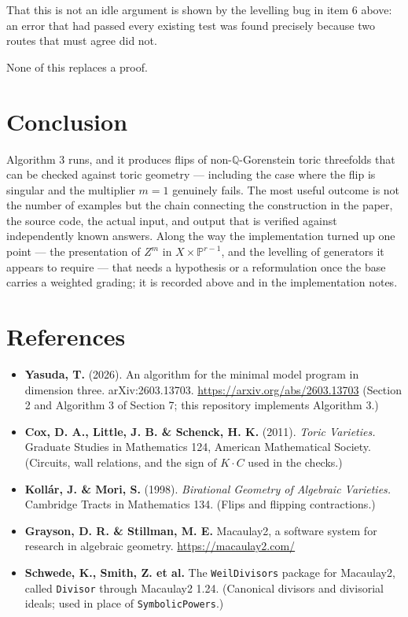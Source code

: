 \documentclass[11pt,reqno]{amsart}
\newcommand{\PP}{\ensuremath{\mathbb{P}}}
\newcommand{\QQ}{\ensuremath{\mathbb{Q}}}
\theoremstyle{plain}
\theoremstyle{definition}
\begin{document}
That this is not an idle argument is shown by the levelling bug in item
6 above: an error that had passed every existing test was found
precisely because two routes that must agree did not.

None of this replaces a proof.

\section{Conclusion}\label{conclusion}

Algorithm 3 runs, and it produces flips of non-\QQ{}-Gorenstein toric
threefolds that can be checked against toric geometry --- including the
case where the flip is singular and the multiplier \(m = 1\) genuinely
fails. The most useful outcome is not the number of examples but the
chain connecting the construction in the paper, the source code, the
actual input, and output that is verified against independently known
answers. Along the way the implementation turned up one point --- the
presentation of \(Z^m\) in \(X \times \PP^{r-1}\), and the levelling of
generators it appears to require --- that needs a hypothesis or a
reformulation once the base carries a weighted grading; it is recorded
above and in the implementation notes.

\section{References}\label{references}

\begin{itemize}
\item
  \textbf{Yasuda, T.} (2026). An algorithm for the minimal model program
  in dimension three. arXiv:2603.13703.
  \url{https://arxiv.org/abs/2603.13703} (Section 2 and Algorithm 3 of
  Section 7; this repository implements Algorithm 3.)
\item
  \textbf{Cox, D. A., Little, J. B. \& Schenck, H. K.} (2011).
  \emph{Toric Varieties.} Graduate Studies in Mathematics 124, American
  Mathematical Society. (Circuits, wall relations, and the sign of
  \(K \cdot C\) used in the checks.)
\item
  \textbf{Kollár, J. \& Mori, S.} (1998). \emph{Birational Geometry of
  Algebraic Varieties.} Cambridge Tracts in Mathematics 134. (Flips and
  flipping contractions.)
\item
  \textbf{Grayson, D. R. \& Stillman, M. E.} Macaulay2, a software
  system for research in algebraic geometry.
  \url{https://macaulay2.com/}
\item
  \textbf{Schwede, K., Smith, Z. et al.} The \texttt{WeilDivisors}
  package for Macaulay2, called \texttt{Divisor} through Macaulay2
  1.24. (Canonical divisors and divisorial ideals; used in place of
  \texttt{SymbolicPowers}.)
\end{itemize}
\end{document}
